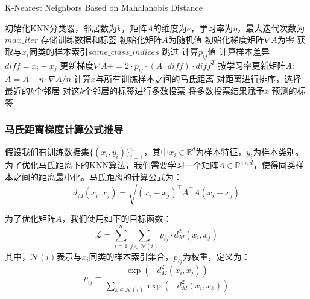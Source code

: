 \documentclass[12pt]{article}
\begin{document}
\begin{algorithm}
  \caption{K-Nearest Neighbors Based on Mahalanobis Distance}
  \label{K-Nearest Neighbors Based on Mahalanobis Distance}
  \begin{algorithmic}[1]
    \State 初始化KNN分类器，邻居数为$k$，矩阵$A$的维度为$e$，学习率为$\eta$，最大迭代次数为$max\_iter$
    \State 存储训练数据和标签
    \State 初始化矩阵$A$为随机值
    \State 初始化梯度矩阵$\nabla A$为零
    \State 获取与$x_i$同类的样本索引$same\_class\_indices$
    \State 跳过
    \EndIf
    \State 计算$p_{ij}$值
    \State 计算样本差异$diff = x_i - x_j$
    \State 更新梯度$\nabla A += 2 \cdot p_{ij} \cdot (A \cdot diff) \cdot diff^T$
    \EndFor
    \EndFor
    \State 按学习率更新矩阵$A$: $A = A - \eta \cdot \nabla A / n$
    \EndFor
    \EndProcedure
    \State 计算$x$与所有训练样本之间的马氏距离
    \State 对距离进行排序，选择最近的$k$个邻居
    \State 对这$k$个邻居的标签进行多数投票
    \State 将多数投票结果赋予$x$
    \EndFor
    \State \Return 预测的标签
    \EndProcedure
  \end{algorithmic}
\end{algorithm}

\subsubsection{马氏距离梯度计算公式推导}

假设我们有训练数据集$\{(x_i, y_i)\}_{i=1}^n$，其中$x_i \in \mathbb{R}^d$为样本特征，$y_i$为样本类别。为了优化马氏距离下的KNN算法，我们需要学习一个矩阵$A \in \mathbb{R}^{e \times d}$，使得同类样本之间的距离最小化。马氏距离的计算公式为：
\begin{equation}
  d_M(x_i, x_j) = \sqrt{(x_i - x_j)^\top A^\top A (x_i - x_j)}
\end{equation}

为了优化矩阵$A$，我们使用如下的目标函数：
\begin{equation}
  \mathcal{L} = \sum_{i=1}^n \sum_{j \in \mathcal{N}(i)} p_{ij} \cdot d_M^2(x_i, x_j)
\end{equation}
其中，$\mathcal{N}(i)$表示与$x_i$同类的样本索引集合，$p_{ij}$为权重，定义为：
\begin{equation}
  p_{ij} = \frac{\exp(-d_M^2(x_i, x_j))}{\sum_{k \in \mathcal{N}(i)} \exp(-d_M^2(x_i, x_k))}
\end{equation}
\end{document}
